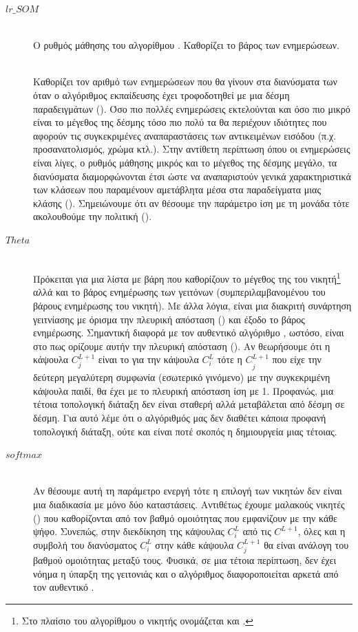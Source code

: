 \begin{description}
  \item[$lr\_SOM$] \hfill \\ Ο ρυθμός μάθησης του αλγορίθμου . Καθορίζει το βάρος των ενημερώσεων.
  \item[] \hfill \\ Καθορίζει τον αριθμό των ενημερώσεων που θα γίνουν στα διανύσματα των  όταν ο αλγόριθμος εκπαίδευσης έχει τροφοδοτηθεί με μια δέσμη παραδειγμάτων (). Όσο πιο πολλές ενημερώσεις εκτελούνται και όσο πιο μικρό είναι το μέγεθος της δέσμης τόσο πιο πολύ τα  θα περιέχουν ιδιότητες που αφορούν τις συγκεκριμένες αναπαραστάσεις των αντικειμένων εισόδου (π.χ. προσανατολισμός, χρώμα κτλ.). Στην αντίθετη περίπτωση όπου οι ενημερώσεις είναι λίγες, ο ρυθμός μάθησης  μικρός και το μέγεθος της δέσμης μεγάλο, τα διανύσματα  διαμορφώνονται έτσι ώστε να αναπαριστούν γενικά χαρακτηριστικά των κλάσεων που παραμένουν αμετάβλητα μέσα στα παραδείγματα μιας κλάσης (). Σημειώνουμε ότι αν θέσουμε την παράμετρο ίση με τη μονάδα τότε ακολουθούμε την πολιτική  ().
  \item[$Theta$] \hfill \\ Πρόκειται για μια λίστα με βάρη που καθορίζουν το μέγεθος της  του νικητή\footnote{Στο πλαίσιο του αλγορίθμου  ο νικητής ονομάζεται και .} αλλά και το βάρος ενημέρωσης των γειτόνων (συμπεριλαμβανομένου του βάρους ενημέρωσης του νικητή). Με άλλα λόγια, είναι μια διακριτή συνάρτηση γειτνίασης με όρισμα την πλευρική απόσταση () και έξοδο το βάρος ενημέρωσης. Σημαντική διαφορά με τον αυθεντικό αλγόριθμο , ωστόσο, είναι στο πως ορίζουμε αυτήν την πλευρική απόσταση (). Αν θεωρήσουμε ότι η κάψουλα $C_j^{L+1}$ είναι το  για την κάψουλα $C_i^L$ τότε η $C^{L+1}_{\grave{j}}$ που είχε την δεύτερη μεγαλύτερη συμφωνία (εσωτερικό γινόμενο) με την συγκεκριμένη κάψουλα παιδί, θα έχει με το  πλευρική απόσταση ίση με 1. Προφανώς, μια τέτοια τοπολογική διάταξη δεν είναι σταθερή αλλά μεταβάλεται από δέσμη σε δέσμη. Για αυτό λέμε ότι ο αλγόριθμός μας δεν διαθέτει κάποια προφανή τοπολογική διάταξη, ούτε και είναι ποτέ σκοπός η δημιουργεία μιας τέτοιας.
  \item[$softmax$] \hfill \\ Αν θέσουμε αυτή τη παράμετρο ενεργή τότε η επιλογή των νικητών δεν είναι μια διαδικασία με μόνο δύο καταστάσεις. Αντιθέτως έχουμε μαλακούς νικητές () που καθορίζονται από τον βαθμό ομοιότητας που εμφανίζουν με την κάθε ψήφο. Συνεπώς, στην διεκδίκηση της κάψουλας $C_i^L$ από τις $C^{L+1}$, όλες  και η συμβολή του διανύσματος  $C_i^L$ στην κάθε κάψουλα $C^{L+1}_j$ θα είναι ανάλογη του βαθμού ομοιότητας μεταξύ τους. Φυσικά, σε μια τέτοια περίπτωση, δεν έχει νόημα η ύπαρξη της γειτονιάς και ο αλγόριθμος διαφοροποιείται αρκετά από τον αυθεντικό .

\end{description}
